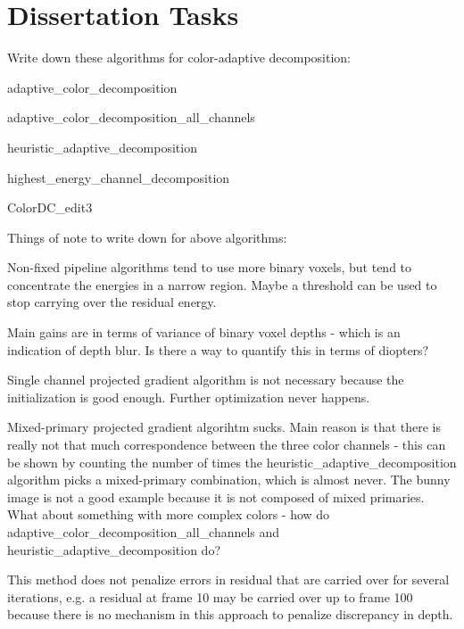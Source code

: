 \section{Dissertation Tasks}
\begin{compact_todolist}
\item Write down these algorithms for color-adaptive decomposition:
    \begin{compact_todolist}
    \item adaptive\_color\_decomposition
    \item adaptive\_color\_decomposition\_all\_channels
    \item heuristic\_adaptive\_decomposition
    \item highest\_energy\_channel\_decomposition
    \item ColorDC\_edit3
    \end{compact_todolist}
\item Things of note to write down for above algorithms:
    \begin{compact_todolist}
    \item Non-fixed pipeline algorithms tend to use more binary voxels, but tend to concentrate the energies in a narrow region. Maybe a threshold can be used to stop carrying over the residual energy. 
    \item Main gains are in terms of variance of binary voxel depths - which is an indication of depth blur. Is there a way to quantify this in terms of diopters?
    \item Single channel projected gradient algorithm is not necessary because the initialization is good enough. Further optimization never happens.
    \item Mixed-primary projected gradient algorihtm sucks. Main reason is that there is really not that much correspondence between the three color channels - this can be shown by counting the number of times the heuristic\_adaptive\_decomposition algorithm picks a mixed-primary combination, which is almost never. The bunny image is not a good example because it is not composed of mixed primaries. What about something with more complex colors - how do adaptive\_color\_decomposition\_all\_channels and heuristic\_adaptive\_decomposition do?
    \item This method does not penalize errors in residual that are carried over for several iterations, e.g. a residual at frame 10 may be carried over up to frame 100 because there is no mechanism in this approach to penalize discrepancy in depth.

\end{compact_todolist}
\end{compact_todolist}
